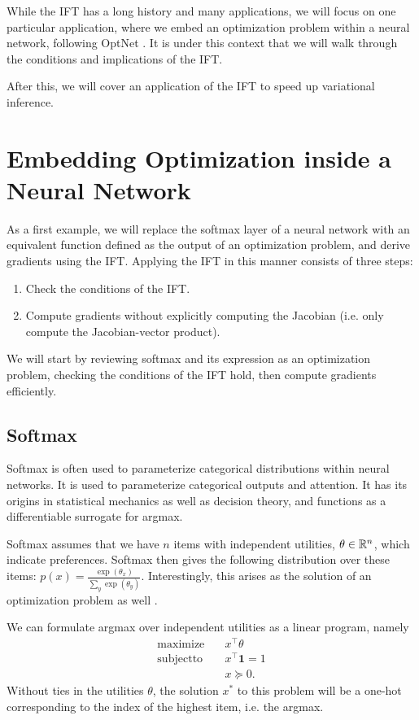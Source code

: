 \documentclass[11pt]{article}
\begin{document}
While the IFT has a long history and many applications, we will focus on one particular application,
where we embed an optimization problem within a neural network,
following OptNet \citep{optnet}.
It is under this context that we will walk through the conditions and implications of the IFT.

After this, we will cover an application of the IFT to speed up variational inference.

\section{Embedding Optimization inside a Neural Network}
As a first example, we will replace the softmax layer of a neural network with an equivalent function
defined as the output of an optimization problem, and derive gradients using the IFT.
Applying the IFT in this manner consists of three steps:
\begin{enumerate}
\item Check the conditions of the IFT.
\item Compute gradients without explicitly computing the Jacobian
    (i.e. only compute the Jacobian-vector product).
\end{enumerate}

We will start by reviewing softmax and its expression as an optimization problem,
checking the conditions of the IFT hold, then compute gradients efficiently.

\subsection{Softmax}
Softmax is often used to parameterize categorical distributions within neural networks.
It is used to parameterize categorical outputs and attention.
It has its origins in statistical mechanics as well as decision theory, and functions
as a differentiable surrogate for argmax.

Softmax assumes that we have $n$ items with independent utilities, $\theta \in \mathbb{R}^n$,
which indicate preferences.
Softmax then gives the following distribution over these items:
$p(x) = \frac{\exp(\theta_x)}{\sum_y \exp(\theta_y)}$.
Interestingly, this arises as the solution of an optimization problem as well \citep{gao2018properties}.

We can formulate argmax over independent utilities as a linear program, namely
\begin{equation}
\begin{aligned}
\mathrm{maximize } \quad & x^\top\theta\\
\mathrm{subject to } \quad & x^\top \mathbf{1} = 1\\
& x \succeq 0.
\end{aligned}
\end{equation}
Without ties in the utilities $\theta$, the solution $x^*$ to this problem will be a
one-hot corresponding to the index of the highest item, i.e. the argmax.
\end{document}
